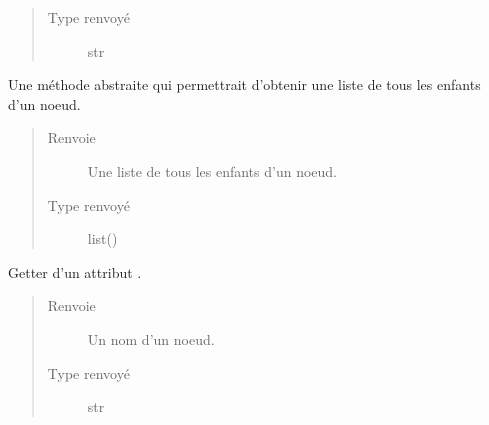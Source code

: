 \documentclass[letterpaper,10pt,french]{sphinxmanual}
\begin{document}
\begin{fulllineitems}
\begin{fulllineitems}
\begin{quote}
\begin{description}
\item[{Type renvoyé}] \leavevmode
str

\end{description}\end{quote}

\end{fulllineitems}


\begin{fulllineitems}
\label{\detokenize{index:StrategyTree.NodeST.get_list_of_children}}
Une méthode abstraite qui permettrait d’obtenir une liste de tous les enfants d’un noeud.
\begin{quote}\begin{description}
\item[{Renvoie}] \leavevmode
{} \textendash{} Une liste de tous les enfants d’un noeud.

\item[{Type renvoyé}] \leavevmode
list({\hyperref[\detokenize{index:StrategyTree.NodeST}]{}})

\end{description}\end{quote}

\end{fulllineitems}


\begin{fulllineitems}
\label{\detokenize{index:StrategyTree.NodeST.get_name}}
Getter d’un attribut .
\begin{quote}\begin{description}
\item[{Renvoie}] \leavevmode
{} \textendash{} Un nom d’un noeud.

\item[{Type renvoyé}] \leavevmode
str

\end{description}\end{quote}

\end{fulllineitems}


\end{fulllineitems}
\end{document}
